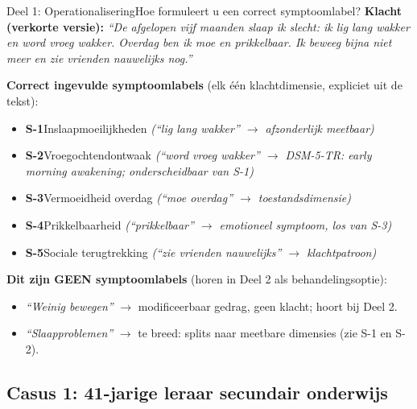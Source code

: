 \documentclass[11pt,a4paper]{article}
\begin{document}
\begin{voorbeeldbox}{Deel 1: Operationalisering}{Hoe formuleert u een correct symptoomlabel?}
\small
\textbf{Klacht (verkorte versie):} \textit{``De afgelopen vijf maanden slaap ik slecht:
ik lig lang wakker en word vroeg wakker. Overdag ben ik moe en prikkelbaar. Ik beweeg
bijna niet meer en zie vrienden nauwelijks nog.''}

\medskip
\textbf{Correct ingevulde symptoomlabels} (elk één klachtdimensie, expliciet uit de tekst):
\begin{itemize}[topsep=2pt,itemsep=1pt]
\item \textbf{S-1}\enspace Inslaapmoeilijkheden
  \hfill\textit{(``lig lang wakker'' $\rightarrow$ afzonderlijk meetbaar)}
\item \textbf{S-2}\enspace Vroegochtendontwaak
  \hfill\textit{(``word vroeg wakker'' $\rightarrow$ DSM-5-TR: early morning awakening; onderscheidbaar van S-1)}
\item \textbf{S-3}\enspace Vermoeidheid overdag
  \hfill\textit{(``moe overdag'' $\rightarrow$ toestandsdimensie)}
\item \textbf{S-4}\enspace Prikkelbaarheid
  \hfill\textit{(``prikkelbaar'' $\rightarrow$ emotioneel symptoom, los van S-3)}
\item \textbf{S-5}\enspace Sociale terugtrekking
  \hfill\textit{(``zie vrienden nauwelijks'' $\rightarrow$ klachtpatroon)}
\end{itemize}

\medskip
\textbf{\color{StrongRed}Dit zijn GEEN symptoomlabels} (horen in Deel 2 als behandelingsoptie):
\begin{itemize}[topsep=1pt,itemsep=0pt]
\item \textit{``Weinig bewegen''} $\rightarrow$ modificeerbaar gedrag, geen klacht; hoort bij Deel 2.
\item \textit{``Slaapproblemen''} $\rightarrow$ te breed: splits naar meetbare dimensies (zie S-1 en S-2).
\end{itemize}
\end{voorbeeldbox}

\vspace{0.5em}

\newpage

\subsection*{Casus 1: 41-jarige leraar secundair onderwijs}
\end{document}
